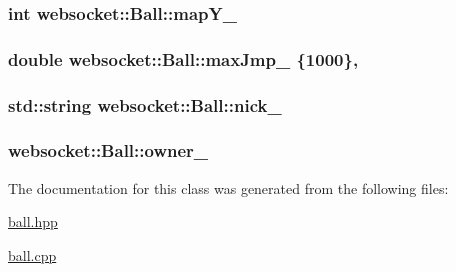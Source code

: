 \subsubsection[{\texorpdfstring{map\+Y\+\_\+}{mapY_}}]{\setlength{\rightskip}{0pt plus 5cm}int websocket\+::\+Ball\+::map\+Y\+\_\+\hspace{0.3cm}{\ttfamily [private]}}\hypertarget{classwebsocket_1_1Ball_a0b93614aa4dd113bae4a53f5196aa254}{}\label{classwebsocket_1_1Ball_a0b93614aa4dd113bae4a53f5196aa254}
\subsubsection[{\texorpdfstring{max\+Jmp\+\_\+}{maxJmp_}}]{\setlength{\rightskip}{0pt plus 5cm}double websocket\+::\+Ball\+::max\+Jmp\+\_\+ \{1000\}\hspace{0.3cm}{\ttfamily [static]}, {\ttfamily [private]}}\hypertarget{classwebsocket_1_1Ball_aea1b5a3677ef07c44e8eda0eb73a8e9f}{}\label{classwebsocket_1_1Ball_aea1b5a3677ef07c44e8eda0eb73a8e9f}
\subsubsection[{\texorpdfstring{nick\+\_\+}{nick_}}]{\setlength{\rightskip}{0pt plus 5cm}std\+::string websocket\+::\+Ball\+::nick\+\_\+\hspace{0.3cm}{\ttfamily [private]}}\hypertarget{classwebsocket_1_1Ball_ac9c16252cac70db6b19e8047aad3b837}{}\label{classwebsocket_1_1Ball_ac9c16252cac70db6b19e8047aad3b837}
\subsubsection[{\texorpdfstring{owner\+\_\+}{owner_}}]{ websocket\+::\+Ball\+::owner\+\_\+\hspace{0.3cm}{\ttfamily [private]}}\hypertarget{classwebsocket_1_1Ball_a19821c2fef55f296918cd67486d194a7}{}\label{classwebsocket_1_1Ball_a19821c2fef55f296918cd67486d194a7}


The documentation for this class was generated from the following files\+:\begin{DoxyCompactItemize}
\item 
\hyperlink{ball_8hpp}{ball.\+hpp}\item 
\hyperlink{ball_8cpp}{ball.\+cpp}\end{DoxyCompactItemize}
